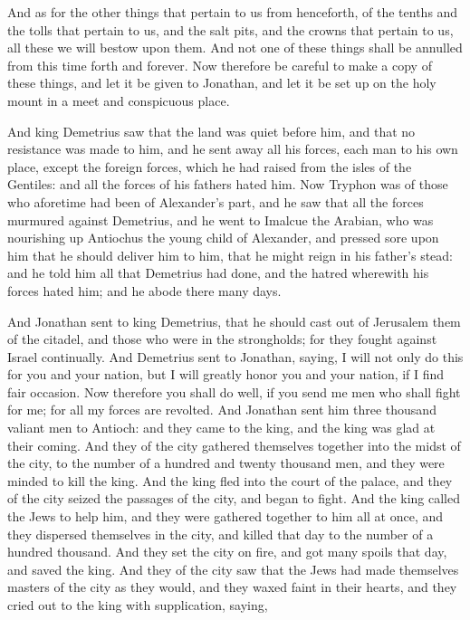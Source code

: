 {And as for the other things that pertain to us from henceforth, of the tenths and the tolls that pertain to us, and the salt pits, and the crowns that pertain to us, all these we will bestow upon them.
And not one of these things shall be annulled from this time forth and forever.
Now therefore be careful to make a copy of these things, and let it be given to Jonathan, and let it be set up on the holy mount in a meet and conspicuous place.
\par }{\PP {}And king Demetrius saw that the land was quiet before him, and that no resistance was made to him, and he sent away all his forces, each man to his own place, except the foreign forces, which he had raised from the isles of the Gentiles: and all the forces of his fathers hated him.
Now Tryphon was of those who aforetime had been of Alexander’s part, and he saw that all the forces murmured against Demetrius, and he went to Imalcue the Arabian, who was nourishing up Antiochus the young child of Alexander,
and pressed sore upon him that he should deliver him to him, that he might reign in his father’s stead: and he told him all that Demetrius had done, and the hatred wherewith his forces hated him; and he abode there many days.
\par }{\PP {}And Jonathan sent to king Demetrius, that he should cast out of Jerusalem them of the citadel, and those who were in the strongholds; for they fought against Israel continually.
And Demetrius sent to Jonathan, saying, I will not only do this for you and your nation, but I will greatly honor you and your nation, if I find fair occasion.
Now therefore you shall do well, if you send me men who shall fight for me; for all my forces are revolted.
And Jonathan sent him three thousand valiant men to Antioch: and they came to the king, and the king was glad at their coming.
And they of the city gathered themselves together into the midst of the city, to the number of a hundred and twenty thousand men, and they were minded to kill the king.
And the king fled into the court of the palace, and they of the city seized the passages of the city, and began to fight.
And the king called the Jews to help him, and they were gathered together to him all at once, and they dispersed themselves in the city, and killed that day to the number of a hundred thousand.
And they set the city on fire, and got many spoils that day, and saved the king.
And they of the city saw that the Jews had made themselves masters of the city as they would, and they waxed faint in their hearts, and they cried out to the king with supplication, saying,
}

